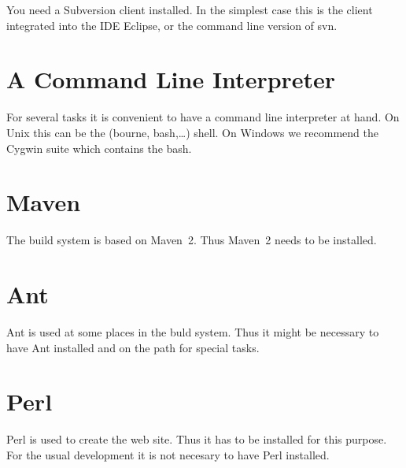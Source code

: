 You need a Subversion client installed. In the simplest case this is the
client integrated into the IDE Eclipse, or the command line version of svn.


\section{A Command Line Interpreter}

For several tasks it is convenient to have a command line interpreter
at hand. On Unix this can be the (bourne, bash,\ldots) shell. On Windows
we recommend the Cygwin suite which contains the bash.

\section{Maven}

The build system is based on Maven~2. Thus Maven~2 needs to be
installed.



\section{Ant}

Ant is used at some places in the buld system. Thus it might be
necessary to have Ant installed and on the path for special tasks.


\section{Perl}

Perl is used to create the web site. Thus it has to be installed for this
purpose. For the usual development it is not necesary to have Perl installed.


